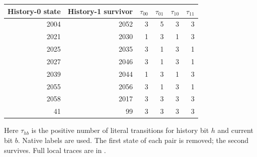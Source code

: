 \begin{center}\small
\begin{tabular}{@{}rrrrrr@{}}
\toprule
History-0 state & History-1 survivor & $\tau_{00}$ & $\tau_{01}$ & $\tau_{10}$ & $\tau_{11}$\\\midrule
2004&2052&3&5&3&3\\
2021&2030&1&3&1&3\\
2025&2035&3&1&3&1\\
2027&2046&3&1&3&1\\
2039&2044&1&3&1&3\\
2055&2056&3&1&3&1\\
2058&2017&3&3&3&3\\
41&99&3&3&3&3\\
\bottomrule
\end{tabular}
\end{center}
Here $\tau_{hb}$ is the positive number of literal transitions for history
bit $h$ and current bit $b$. Native labels are used. The first state of each
pair is removed; the second survives. Full local traces are in
.
